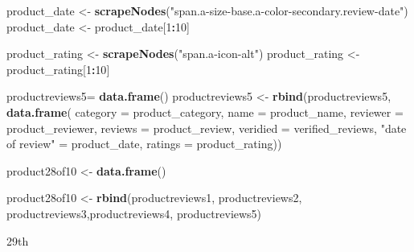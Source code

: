 \documentclass[
]{article}
\newenvironment{Shaded}{\begin{snugshade}}{\end{snugshade}}
\newcommand{\AttributeTok}[1]{\textcolor[rgb]{0.13,0.29,0.53}{#1}}
\newcommand{\DecValTok}[1]{\textcolor[rgb]{0.00,0.00,0.81}{#1}}
\newcommand{\FunctionTok}[1]{\textcolor[rgb]{0.13,0.29,0.53}{\textbf{#1}}}
\newcommand{\NormalTok}[1]{#1}
\newcommand{\OtherTok}[1]{\textcolor[rgb]{0.56,0.35,0.01}{#1}}
\newcommand{\SpecialCharTok}[1]{\textcolor[rgb]{0.81,0.36,0.00}{\textbf{#1}}}
\newcommand{\StringTok}[1]{\textcolor[rgb]{0.31,0.60,0.02}{#1}}
\begin{document}
\begin{Shaded}
\begin{Highlighting}[]
\NormalTok{  product\_date }\OtherTok{\textless{}{-}} \FunctionTok{scrapeNodes}\NormalTok{(}\StringTok{"span.a{-}size{-}base.a{-}color{-}secondary.review{-}date"}\NormalTok{)}
\NormalTok{  product\_date }\OtherTok{\textless{}{-}}\NormalTok{ product\_date[}\DecValTok{1}\SpecialCharTok{:}\DecValTok{10}\NormalTok{]}
  
\NormalTok{  product\_rating }\OtherTok{\textless{}{-}} \FunctionTok{scrapeNodes}\NormalTok{(}\StringTok{"span.a{-}icon{-}alt"}\NormalTok{)}
\NormalTok{  product\_rating }\OtherTok{\textless{}{-}}\NormalTok{ product\_rating[}\DecValTok{1}\SpecialCharTok{:}\DecValTok{10}\NormalTok{]}
  
\NormalTok{  productreviews5}\OtherTok{=} \FunctionTok{data.frame}\NormalTok{()}
\NormalTok{  productreviews5 }\OtherTok{\textless{}{-}} \FunctionTok{rbind}\NormalTok{(productreviews5, }\FunctionTok{data.frame}\NormalTok{(}
                      \AttributeTok{category =}\NormalTok{ product\_category,}
                      \AttributeTok{name =}\NormalTok{ product\_name,}
                      \AttributeTok{reviewer =}\NormalTok{ product\_reviewer,}
                      \AttributeTok{reviews =}\NormalTok{ product\_review,}
                      \AttributeTok{veridied =}\NormalTok{ verified\_reviews,}
                      \StringTok{"date of review"} \OtherTok{=}\NormalTok{ product\_date,}
                      \AttributeTok{ratings =}\NormalTok{ product\_rating))}
  
\NormalTok{  product28of10 }\OtherTok{\textless{}{-}} \FunctionTok{data.frame}\NormalTok{()}
  
\NormalTok{  product28of10 }\OtherTok{\textless{}{-}} \FunctionTok{rbind}\NormalTok{(productreviews1, productreviews2, productreviews3,productreviews4, productreviews5)}
\end{Highlighting}
\end{Shaded}

29th
\end{document}
